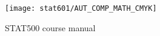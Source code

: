 
\texttt{[image: stat601/AUT\_COMP\_MATH\_CMYK]}

\begin{centering}
{\Huge STAT500 course manual}
\end{centering}


